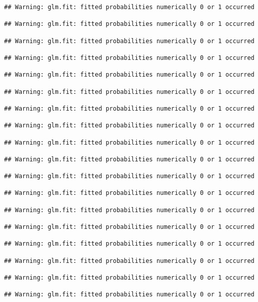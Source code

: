 \documentclass[]{article}
\newenvironment{Shaded}{\begin{snugshade}}{\end{snugshade}}
\newcommand{\CommentTok}[1]{\textcolor[rgb]{0.56,0.35,0.01}{\textit{#1}}}
\newcommand{\DataTypeTok}[1]{\textcolor[rgb]{0.13,0.29,0.53}{#1}}
\newcommand{\DecValTok}[1]{\textcolor[rgb]{0.00,0.00,0.81}{#1}}
\newcommand{\KeywordTok}[1]{\textcolor[rgb]{0.13,0.29,0.53}{\textbf{#1}}}
\newcommand{\NormalTok}[1]{#1}
\newcommand{\OperatorTok}[1]{\textcolor[rgb]{0.81,0.36,0.00}{\textbf{#1}}}
\newcommand{\StringTok}[1]{\textcolor[rgb]{0.31,0.60,0.02}{#1}}
\begin{document}
\begin{Shaded}
\end{Shaded}

\begin{verbatim}
## Warning: glm.fit: fitted probabilities numerically 0 or 1 occurred

## Warning: glm.fit: fitted probabilities numerically 0 or 1 occurred

## Warning: glm.fit: fitted probabilities numerically 0 or 1 occurred

## Warning: glm.fit: fitted probabilities numerically 0 or 1 occurred

## Warning: glm.fit: fitted probabilities numerically 0 or 1 occurred

## Warning: glm.fit: fitted probabilities numerically 0 or 1 occurred

## Warning: glm.fit: fitted probabilities numerically 0 or 1 occurred

## Warning: glm.fit: fitted probabilities numerically 0 or 1 occurred

## Warning: glm.fit: fitted probabilities numerically 0 or 1 occurred

## Warning: glm.fit: fitted probabilities numerically 0 or 1 occurred

## Warning: glm.fit: fitted probabilities numerically 0 or 1 occurred

## Warning: glm.fit: fitted probabilities numerically 0 or 1 occurred

## Warning: glm.fit: fitted probabilities numerically 0 or 1 occurred

## Warning: glm.fit: fitted probabilities numerically 0 or 1 occurred

## Warning: glm.fit: fitted probabilities numerically 0 or 1 occurred

## Warning: glm.fit: fitted probabilities numerically 0 or 1 occurred

## Warning: glm.fit: fitted probabilities numerically 0 or 1 occurred

## Warning: glm.fit: fitted probabilities numerically 0 or 1 occurred
\end{verbatim}
\end{document}
